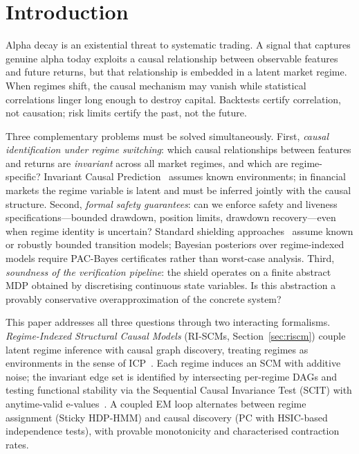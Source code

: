 \documentclass[11pt]{article}
\begin{document}
\section{Introduction}\label{sec:intro}

Alpha decay is an existential threat to systematic trading.  A signal
that captures genuine alpha today exploits a causal relationship between
observable features and future returns, but that relationship is embedded
in a latent market regime.  When regimes shift, the causal mechanism may
vanish while statistical correlations linger long enough to destroy
capital.  Backtests certify correlation, not causation; risk limits
certify the past, not the future.

Three complementary problems must be solved simultaneously.  First,
\emph{causal identification under regime switching}: which causal
relationships between features and returns are \emph{invariant} across
all market regimes, and which are regime-specific?  Invariant Causal
Prediction~\cite{peters2016causal} assumes known environments; in
financial markets the regime variable is latent and must be inferred
jointly with the causal structure.  Second, \emph{formal safety
guarantees}: can we enforce safety and liveness
specifications---bounded drawdown, position limits, drawdown
recovery---even when regime identity is uncertain?  Standard shielding
approaches~\cite{alshiekh2018safe, jansen2020safe} assume known or
robustly bounded transition models; Bayesian posteriors over regime-indexed
models require PAC-Bayes certificates rather than worst-case analysis.
Third, \emph{soundness of the verification pipeline}: the shield
operates on a finite abstract MDP obtained by discretising continuous
state variables.  Is this abstraction a provably conservative
overapproximation of the concrete system?

This paper addresses all three questions through two interacting
formalisms.  \emph{Regime-Indexed Structural Causal Models} (RI-SCMs,
Section~\ref{sec:riscm}) couple latent regime inference with causal
graph discovery, treating regimes as environments in the sense of
ICP~\cite{peters2016causal}.  Each regime induces an SCM with additive
noise; the invariant edge set is identified by intersecting per-regime
DAGs and testing functional stability via the Sequential Causal
Invariance Test (SCIT) with anytime-valid
e-values~\cite{grunwald2024safe}.  A coupled EM loop alternates between
regime assignment (Sticky HDP-HMM) and causal discovery (PC with
HSIC-based independence tests), with provable monotonicity and
characterised contraction rates.
\end{document}
